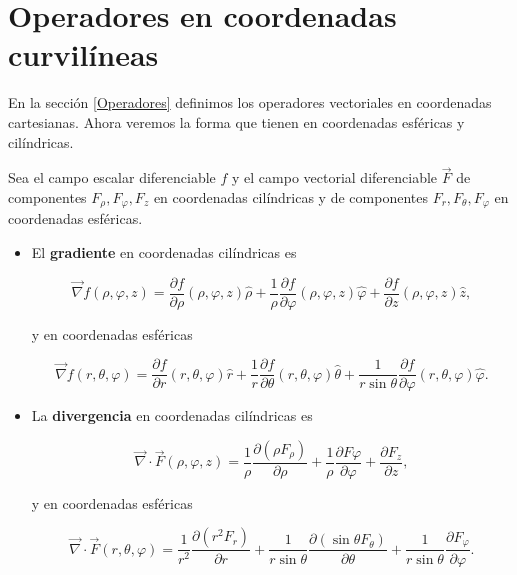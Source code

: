 \section{Operadores en coordenadas curvilíneas}

En la sección \ref{Operadores} definimos los operadores vectoriales en coordenadas cartesianas. Ahora veremos la forma que tienen en coordenadas esféricas y cilíndricas.

Sea el campo escalar diferenciable $f$ y el campo vectorial diferenciable $\vec{F}$ de componentes $F_{\rho}, F_{\varphi}, F_z$ en coordenadas cilíndricas y de componentes $F_r, F_{\theta}, F_{\varphi}$  en coordenadas esféricas.

\begin{itemize}
\item[i)] El \textbf{gradiente} en coordenadas cilíndricas es
\begin{shaded}
\begin{equation}
\vec{\nabla} f(\rho, \varphi,z) = \frac{\partial f}{\partial \rho} (\rho, \varphi, z) \hat{\rho} + \frac{1}{\rho}  \frac{\partial f}{\partial \varphi} (\rho, \varphi, z) \hat{\varphi} + \frac{\partial f}{\partial z} (\rho, \varphi, z) \hat{z},
\end{equation}
\end{shaded}
y en coordenadas esféricas
\begin{shaded}
\begin{equation}
\vec{\nabla} f(r, \theta,\varphi) = \frac{\partial f}{\partial r} (r, \theta, \varphi) \hat{r} + \frac{1}{r} \frac{\partial f}{\partial \theta}(r, \theta, \varphi) \hat{\theta} + \frac{1}{r\sin\theta}\frac{\partial f}{\partial \varphi}(r, \theta, \varphi) \hat{\varphi}.
\end{equation}
\end{shaded}

\item[ii)] La \textbf{divergencia} en coordenadas cilíndricas es
\begin{shaded}
\begin{equation}
\vec{\nabla} \cdot \vec{F}(\rho, \varphi,z) = \frac{1}{\rho} \frac{\partial(\rho F_{\rho})}{\partial \rho} + \frac{1}{\rho} \frac{\partial F{\varphi}}{\partial\varphi} + \frac{\partial F_z}{\partial z},
\end{equation}
\end{shaded}
y en coordenadas esféricas
\begin{shaded}
\begin{equation}
\vec{\nabla} \cdot \vec{F}(r,\theta, \varphi) = \frac{1}{r^2} \frac{\partial (r^2 F_r)}{\partial r} + \frac{1}{r\sin\theta} \frac{\partial (\sin\theta F_{\theta})}{\partial \theta} + \frac{1}{r\sin\theta} \frac{\partial F_{\varphi}}{\partial \varphi}.
\end{equation}
\end{shaded}


\end{itemize}
